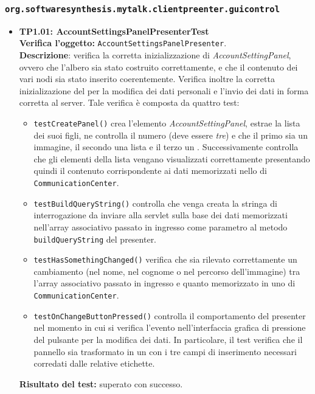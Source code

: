 \subsubsection{\texttt{org.softwaresynthesis.mytalk.clientpreenter.guicontrol}}

\begin{itemize}
\item \textbf{TP1.01: AccountSettingsPanelPresenterTest}\\
\textbf{Verifica l'oggetto:} \texttt{AccountSettingsPanelPresenter}.\\
\textbf{Descrizione}: verifica la corretta inizializzazione di \textit{AccountSettingPanel}, ovvero che l'albero sia stato costruito correttamente, e che il contenuto dei vari nodi sia stato inserito coerentemente. Verifica inoltre la corretta inizializazione del  per la modifica dei dati personali e l'invio dei dati in forma corretta al server.
Tale verifica è composta da quattro test:
\begin{itemize}
\item \texttt{testCreatePanel()} crea l'elemento \textit{AccountSettingPanel}, estrae la lista dei suoi figli, ne controlla il numero (deve essere \textit{tre}) e che il primo sia un immagine, il secondo una lista e il terzo un .
Successivamente controlla che gli elementi della lista vengano visualizzati correttamente presentando quindi il contenuto corrispondente ai dati memorizzati nello  di \texttt{CommunicationCenter}.
\item \texttt{testBuildQueryString()} controlla che venga creata la stringa di interrogazione da inviare alla servlet sulla base dei dati memorizzati nell'array associativo passato in ingresso come parametro al metodo \texttt{buildQueryString} del presenter.
\item \texttt{testHasSomethingChanged()} verifica che sia rilevato correttamente un cambiamento (nel nome, nel cognome o nel percorso dell'immagine) tra l'array associativo passato in ingresso e quanto memorizzato in uno  di \texttt{CommunicationCenter}.
\item \texttt{testOnChangeButtonPressed()} controlla il comportamento del presenter nel momento in cui si verifica l'evento nell'interfaccia grafica di pressione del pulsante per la modifica dei dati. In particolare, il test verifica che il pannello sia trasformato in un  con i tre campi di inserimento necessari corredati dalle relative etichette.
\end{itemize}
\textbf{Risultato del test:} superato con successo.


\end{itemize}

